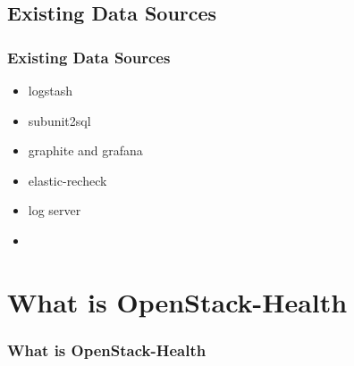 \documentclass[aspectratio=169,11pt,hyperref={colorlinks=true}]{beamer}
\begin{document}
\subsection{Existing Data Sources}
\begin{frame}
    \frametitle{Existing Data Sources}
    \begin{itemize}
        \item logstash
        \item subunit2sql
        \item graphite and grafana
        \item elastic-recheck
        \item log server
        \item 
    \end{itemize}
\end{frame}

\section{What is OpenStack-Health}
\begin{frame}
    \frametitle{What is OpenStack-Health}
\end{frame}
\end{document}
